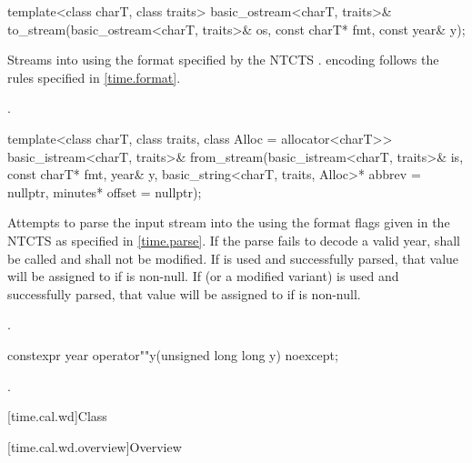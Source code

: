 %
\begin{itemdecl}
template<class charT, class traits>
  basic_ostream<charT, traits>&
    to_stream(basic_ostream<charT, traits>& os, const charT* fmt, const year& y);
\end{itemdecl}

\begin{itemdescr}
\pnum
\effects
Streams  into  using
the format specified by the NTCTS .
 encoding follows the rules specified in \ref{time.format}.

\pnum
\returns {}.
\end{itemdescr}

%
\begin{itemdecl}
template<class charT, class traits, class Alloc = allocator<charT>>
  basic_istream<charT, traits>&
    from_stream(basic_istream<charT, traits>& is, const charT* fmt,
                year& y, basic_string<charT, traits, Alloc>* abbrev = nullptr,
                minutes* offset = nullptr);
\end{itemdecl}

\begin{itemdescr}
\pnum
\effects
Attempts to parse the input stream 
into the   using
the format flags given in the NTCTS 
as specified in \ref{time.parse}.
If the parse fails to decode a valid year,
 shall be called
and  shall not be modified.
If  is used and successfully parsed,
that value will be assigned to  if  is non-null.
If  (or a modified variant) is used and successfully parsed,
that value will be assigned to  if  is non-null.

\pnum
\returns {}.
\end{itemdescr}

%
\begin{itemdecl}
constexpr year operator""y(unsigned long long y) noexcept;
\end{itemdecl}

\begin{itemdescr}
\pnum
\returns {}.
\end{itemdescr}

[time.cal.wd]{Class }

[time.cal.wd.overview]{Overview}

